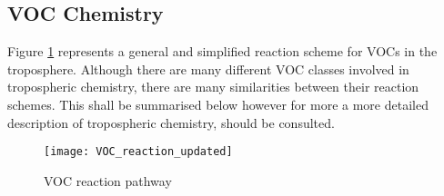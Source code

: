 \subsection{VOC Chemistry}
Figure \ref{f:VOC_reaction} represents a general and simplified reaction scheme for VOCs in the troposphere. Although there are
many different VOC classes involved in tropospheric chemistry, there are many similarities between their reaction schemes. This
shall be summarised below however for more a more detailed description of tropospheric chemistry, \citep{Atkinson:2000} should 
be consulted. 
\begin{figure}
    \begin{center}
        \texttt{[image: VOC\_reaction\_updated]}
        \caption[what is this]{VOC reaction pathway}
        \label{f:VOC_reaction}
    \end{center}
\end{figure}

